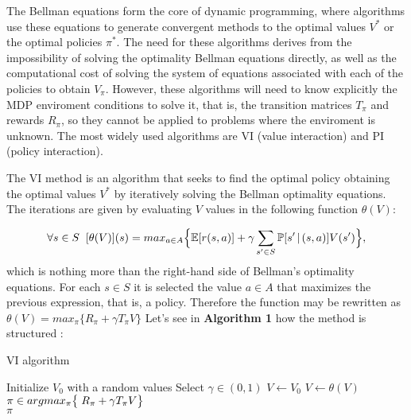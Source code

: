 \documentclass[12pt]{article}
\numberwithin{equation}{section}
\begin{document}
The Bellman equations form the core of dynamic programming, where algorithms use these equations to generate convergent methods to the optimal values $V^*$ or the optimal policies $\pi^*$. The need for these algorithms derives from the impossibility of solving the optimality Bellman equations directly, as well as the computational cost of solving the system of equations associated with each of the policies to obtain $V_\pi$. However, these algorithms will need to know explicitly the MDP  enviroment conditions to solve it, that is, the transition matrices $T_\pi$ and rewards $R_{\pi}$, so they cannot be applied to problems where the enviroment is unknown. The most widely used algorithms are VI (value interaction) and PI (policy interaction).






The VI method is an algorithm that seeks to find the optimal policy  obtaining the optimal values $V^*$ by iteratively solving the Bellman optimality equations. The iterations are given by evaluating  $V$ values  in the following function $\theta (V)$:


$$  \forall s \in S  \hspace{2mm} [\theta(V)](s)= max_{a \in A} \Bigl\{ \mathbb{E}[r(s,a)]+ \gamma \sum_{s' \in S} \mathbb{P}[s' \hspace{.5mm}|\hspace{.5mm} (s,a) ]V(s')\Bigl\}, $$which is nothing more than the right-hand side of Bellman's optimality equations. For each $s \in S$  it is selected the value $a \in A$ that maximizes the previous expression, that is, a policy. Therefore the function  may be rewritten as $\theta(V)= max_{\pi} \bigl\{ R_\pi+ \gamma T_\pi V \bigl\} $ Let's  see  in {\bf Algorithm 1}  how the method is structured :


\begin{algorithm}
\caption{VI algorithm}
\begin{algorithmic}
\State Initialize $V_0$ with a random values
\State Select $\gamma \in (0,1)$
\State $V \longleftarrow V_0$
\State $V \longleftarrow  \theta(V) $
\EndWhile
\State $ \pi \in argmax_{\pi}  \bigl\{ \hspace{1mm} R_\pi+ \gamma T_\pi V\bigl\} $ \\
\Return $\pi$ 
\end{algorithmic}
\end{algorithm}
\end{document}

